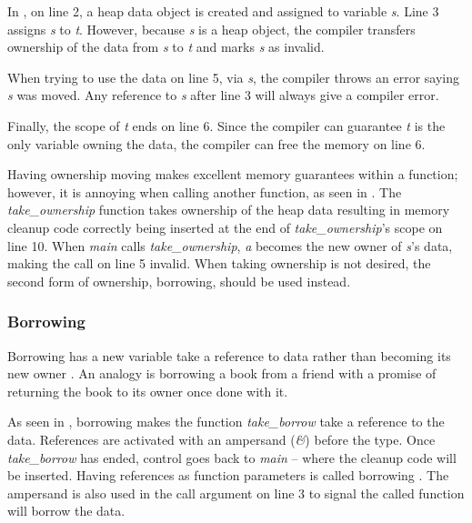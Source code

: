 
In , on line 2, a heap data object is created and assigned to variable \textit{s}.
Line 3 assigns \textit{s} to \textit{t}.
However, because \textit{s} is a heap object, the compiler transfers ownership of the data from \textit{s} to \textit{t} and marks \textit{s} as invalid.

When trying to use the data on line 5, via \textit{s}, the compiler throws an error saying \textit{s} was moved.
Any reference to \textit{s} after line 3 will always give a compiler error.

Finally, the scope of \textit{t} ends on line 6.
Since the compiler can guarantee \textit{t} is the only variable owning the data, the compiler can free the memory on line 6.


Having ownership moving makes excellent memory guarantees within a function; however, it is annoying when calling another function, as seen in .
The \textit{take\_ownership} function takes ownership of the heap data resulting in memory cleanup code correctly being inserted at the end of \textit{take\_ownership}'s scope on line 10.
When \textit{main} calls \textit{take\_ownership}, \textit{a} becomes the new owner of \textit{s}'s data, making the call on line 5 invalid.
When taking ownership is not desired, the second form of ownership, borrowing, should be used instead.

\subsubsection{Borrowing}

Borrowing has a new variable take a reference to data rather than becoming its new owner \cite{klabnik_2019_01}.
An analogy is borrowing a book from a friend with a promise of returning the book to its owner once done with it.


As seen in , borrowing makes the function \textit{take\_borrow} take a reference to the data.
References are activated with an ampersand (\textit{\&}) before the type.
Once \textit{take\_borrow} has ended, control goes back to \textit{main} -- where the cleanup code will be inserted.
Having references as function parameters is called borrowing \cite{klabnik_2019_01}.
The ampersand is also used in the call argument on line 3 to signal the called function will borrow the data.

